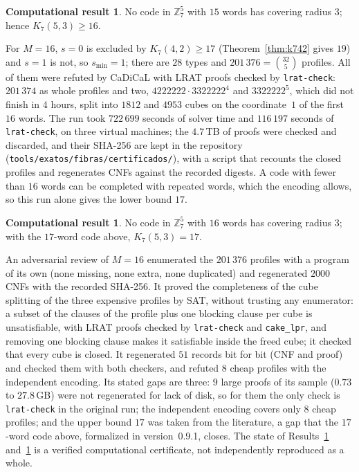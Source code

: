 \documentclass[11pt]{amsart}
\theoremstyle{definition}
\newtheorem{result}[theorem]{Computational result}
\theoremstyle{remark}
\begin{document}
\begin{result}\label{res:k753}
No code in $\mathbb{Z}_7^5$ with $15$ words has covering radius $3$; hence $K_7(5,3)\ge 16$.
\end{result}
For $M=16$, $s=0$ is excluded by $K_7(4,2)\ge 17$ (Theorem~\ref{thm:k742} gives $19$) and $s=1$ is not, so $s_{\min}=1$; there are $28$ types and $201\,376=\binom{32}{5}$ profiles.
All of them were refuted by CaDiCaL with LRAT proofs checked by \texttt{lrat-check}: $201\,374$ as whole profiles and two, $4222222\cdot 3322222^4$ and $3322222^5$, which did not finish in $4$ hours, split into $1812$ and $4953$ cubes on the coordinate~$1$ of the first $16$ words.
The run took $722\,699$ seconds of solver time and $116\,197$ seconds of \texttt{lrat-check}, on three virtual machines; the $4.7$\,TB of proofs were checked and discarded, and their SHA-256 are kept in the repository (\texttt{tools/\allowbreak exatos/\allowbreak fibras/\allowbreak certificados/}), with a script that recounts the closed profiles and regenerates CNFs against the recorded digests.
A code with fewer than $16$ words can be completed with repeated words, which the encoding allows, so this run alone gives the lower bound $17$.

\begin{result}\label{res:k753b}
No code in $\mathbb{Z}_7^5$ with $16$ words has covering radius $3$; with the $17$-word code above, $K_7(5,3)=17$.
\end{result}
An adversarial review of $M=16$ enumerated the $201\,376$ profiles with a program of its own (none missing, none extra, none duplicated) and regenerated $2000$ CNFs with the recorded SHA-256.
It proved the completeness of the cube splitting of the three expensive profiles by SAT, without trusting any enumerator: a subset of the clauses of the profile plus one blocking clause per cube is unsatisfiable, with LRAT proofs checked by \texttt{lrat-check} and \texttt{cake\_lpr}, and removing one blocking clause makes it satisfiable inside the freed cube; it checked that every cube is closed.
It regenerated $51$ records bit for bit (CNF and proof) and checked them with both checkers, and refuted $8$ cheap profiles with the independent encoding.
Its stated gaps are three: $9$ large proofs of its sample ($0.73$ to $27.8$\,GB) were not regenerated for lack of disk, so for them the only check is \texttt{lrat-check} in the original run; the independent encoding covers only $8$ cheap profiles; and the upper bound $17$ was taken from the literature, a gap that the $17$-word code above, formalized in version~0.9.1, closes.
The state of Results~\ref{res:k753} and~\ref{res:k753b} is a verified computational certificate, not independently reproduced as a whole.
\end{document}
